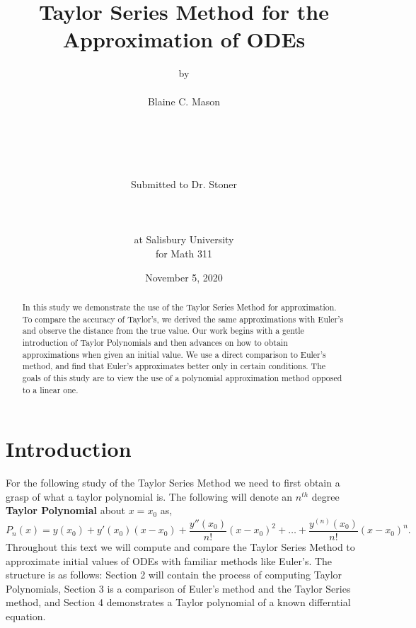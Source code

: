 \documentclass[12pt, letterpaper]{article}  %
\title{Taylor Series Method for the Approximation of ODEs}
\author{by\\ \\ Blaine C. Mason \\ \\ \\ \\ \\ \\ Submitted to Dr. Stoner\\ \\ \\ \\ at Salisbury University
\\ for Math 311}
\date{November 5, 2020}
\begin{document}
\maketitle            %

\onehalfspacing




\thispagestyle{plain}                   %
\newpage
\begin{abstract}
In this study we demonstrate the use of the Taylor Series Method for approximation.  To compare the 
accuracy of Taylor's, we derived the same approximations with Euler's and observe the distance from the true value.  Our work
begins with a gentle introduction of Taylor Polynomials and then advances on how to obtain approximations when given an initial value.  We use 
a direct comparison to Euler's method, and find that Euler's approximates better only in certain conditions. 
The goals of this study are to view the use of a polynomial approximation method opposed to a linear one.   
\end{abstract}
\pagebreak


\section{Introduction}
For the following study of the Taylor Series Method we need to first obtain a grasp of what a taylor
polynomial is.  The following will denote an $n^{th}$ degree \textbf{Taylor Polynomial} about $x=x_0$ as,
\begin{equation}
\label{eqn:1}
P_n(x) = y(x_0) + y'(x_0)(x-x_0) + \dfrac{y''(x_0)}{n!}(x-x_0)^2 + \dots + \dfrac{y^{(n)}(x_0)}{n!}(x-x_0)^n.
\end{equation}
Throughout this text we will compute and compare the Taylor Series Method to approximate initial values of ODEs with familiar methods like Euler's.
The structure is as follows: Section 2 will contain the process of computing Taylor Polynomials, Section 3 is a comparison of Euler's method and the Taylor Series method, and
Section 4 demonstrates a Taylor polynomial of a known differntial equation.
\end{document}
